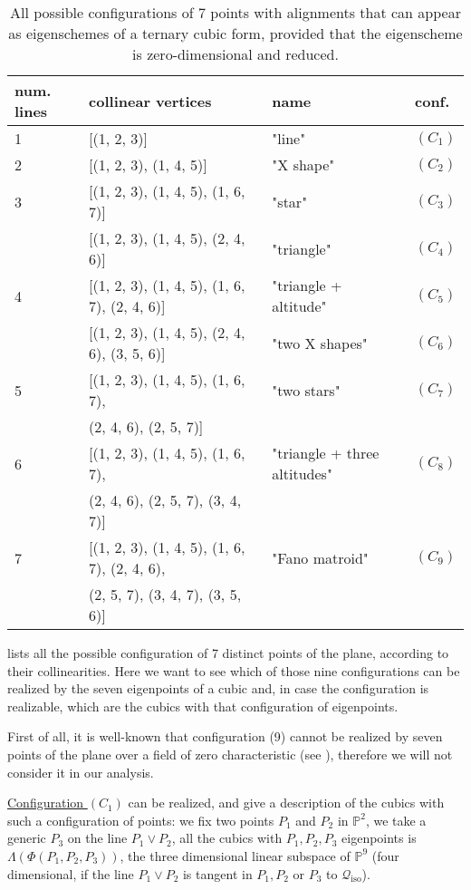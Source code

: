 \documentclass{amsart}
\theoremstyle{plain}
\theoremstyle{definition}
\newcommand{\iso}{\mathcal{Q}_{\mathrm{iso}}}
\begin{document}
\begin{table}
\caption{All possible configurations of $7$ points with alignments that can appear as eigenschemes of a ternary cubic form, provided that the eigenscheme is zero-dimensional and reduced.}
\centering
\begin{tabular}{|llll|}\hline
  num. lines  & collinear vertices & name & conf.\\ \hline
 1& [(1, 2, 3)] & "line" & $(C_1)$\\
 2& [(1, 2, 3), (1, 4, 5)] & "X shape"& $(C_2)$\\
 3& [(1, 2, 3), (1, 4, 5), (1, 6, 7)] & "star" & $(C_3)$\\
  & [(1, 2, 3), (1, 4, 5), (2, 4, 6)] & "triangle" & $(C_4)$\\
 4& [(1, 2, 3), (1, 4, 5), (1, 6, 7), (2, 4, 6)] & "triangle + altitude"
& $(C_5)$\\
  & [(1, 2, 3), (1, 4, 5), (2, 4, 6), (3, 5, 6)] & "two X shapes" & $(C_6)$\\
 5& [(1, 2, 3), (1, 4, 5), (1, 6, 7), & "two stars" & $(C_7)$\\
  & \phantom{[}(2, 4, 6), (2, 5, 7)] & &\\
 6& [(1, 2, 3), (1, 4, 5), (1, 6, 7), & "triangle + three altitudes" & $(C_8)$\\
  & \phantom{[} (2, 4, 6), (2, 5, 7), (3, 4, 7)] & & \\
 7& [(1, 2, 3),
   (1, 4, 5),
   (1, 6, 7),
   (2, 4, 6), & "Fano matroid" & $(C_9)$\\
  & \phantom{[} (2, 5, 7),
   (3, 4, 7),
   (3, 5, 6)] & & \\ \hline
\end{tabular}
\label{table:all_alignments}
\end{table}

 lists all the possible configuration
of 7 distinct points of the plane, according to their collinearities. Here
we want to see which of those nine configurations can be realized by
the seven eigenpoints of a cubic and, in case the configuration is
realizable, which are the cubics with that configuration of eigenpoints.

First of all, it is well-known that configuration (9) cannot be realized
by seven points of the plane over a field of zero
characteristic (see \cite{Whitney1935}), therefore we will not consider
it in our analysis.

\underline{Configuration $(C_1)$} can be realized,
 and 
give a description of the cubics with such a configuration of points:
we fix two points $P_1$ and $P_2$ in $\mathbb{P}^2$, we take a generic $P_3$
on the line $P_1\vee P_2$, all the cubics with
$P_1, P_2, P_3$ eigenpoints is $\Lambda(\Phi(P_1, P_2, P_3))$, the three
dimensional linear subspace of $\mathbb{P}^9$ (four dimensional, if the
line $P_1\vee P_2$ is tangent in $P_1, P_2$ or $P_3$ to $\iso$).
\end{document}
